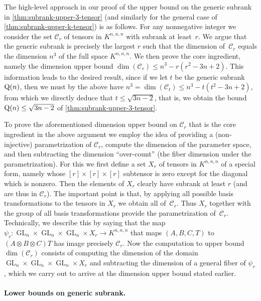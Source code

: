 \documentclass[11pt]{article}
\theoremstyle{definition}
\theoremstyle{remark}
\newcommand{\gensubrank}{{\rm Q}}
\newcommand{\GL}{\operatorname{GL}}
\begin{document}
The high-level approach in our proof of the upper bound on the generic subrank in \autoref{thm:subrank-upper-3-tensor} (and similarly for the general case of \autoref{thm:subrank-upper-k-tensor}) is as follows. For any nonnegative integer we consider the set $\mathcal{C}_r$ of tensors in $K^{n,n,n}$ with subrank at least~$r$. We argue that the generic subrank is precisely the largest $r$ such that the dimension of~$\mathcal{C}_r$ equals the dimension $n^3$ of the full space $K^{n,n,n}$. We then prove the core ingredient, namely the dimension upper bound $\dim(\mathcal{C}_r) \leq n^3 - r(r^2 - 3n + 2)$. This information leads to the desired result, since if we let $t$ be the generic subrank $\gensubrank(n)$, then we must by the above have $n^3 = \dim(\mathcal{C}_t) \leq n^3 - t(t^2 - 3n + 2)$, from which we directly deduce that $t\leq \sqrt{3n - 2}$, that is, we obtain the bound $\gensubrank(n) \leq \sqrt{3n-2}$ of \autoref{thm:subrank-upper-3-tensor}.

To prove the aforementioned dimension upper bound on $\mathcal{C}_r$ that is the core ingredient in the above argument we employ the idea of providing a (non-injective) parametrization of $\mathcal{C}_r$, compute the dimension of the parameter space, and then subtracting the dimension ``over-count'' (the fiber dimension under the parametrization). 
%
For this we first define a set $X_r$ of tensors in $K^{n,n,n}$ of a special form, namely whose $[r]\times [r]\times [r]$ subtensor is zero except for the diagonal which is nonzero. Then the elements of $X_r$ clearly have subrank at least $r$ (and are thus in $\mathcal{C}_r$). %
The important point is that, by applying all possible basis transformations to the tensors in $X_r$ we obtain all of~$\mathcal{C}_r$.
Thus $X_r$ together with the group of all basis transformations provide the parametrization of~$\mathcal{C}_r$.
Technically, we describe this by saying that the map $\psi_r : \GL_n \times \GL_n \times \GL_n \times X_r \to K^{n,n,n}$ that maps $(A, B, C, T)$ to $(A \otimes B \otimes C)T$ has image precisely $\mathcal{C}_r$. Now the computation to upper bound $\dim(\mathcal{C}_r)$ consists of computing the dimension of the domain $\GL_n \times \GL_n \times \GL_n \times X_r$ and subtracting the dimension of a general fiber of $\psi_r$, which we carry out to arrive at the dimension upper bound stated earlier.

\paragraph{Lower bounds on generic subrank.}
\end{document}
